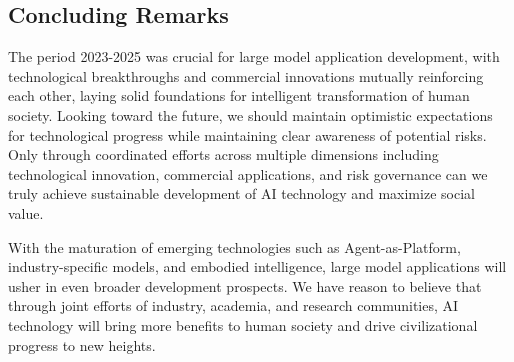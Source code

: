 \documentclass{article}
\begin{document}
\subsection{Concluding Remarks}
The period 2023-2025 was crucial for large model application development, with technological breakthroughs and commercial innovations mutually reinforcing each other, laying solid foundations for intelligent transformation of human society. Looking toward the future, we should maintain optimistic expectations for technological progress while maintaining clear awareness of potential risks. Only through coordinated efforts across multiple dimensions including technological innovation, commercial applications, and risk governance can we truly achieve sustainable development of AI technology and maximize social value.

With the maturation of emerging technologies such as Agent-as-Platform, industry-specific models, and embodied intelligence, large model applications will usher in even broader development prospects. We have reason to believe that through joint efforts of industry, academia, and research communities, AI technology will bring more benefits to human society and drive civilizational progress to new heights.
\end{document}
